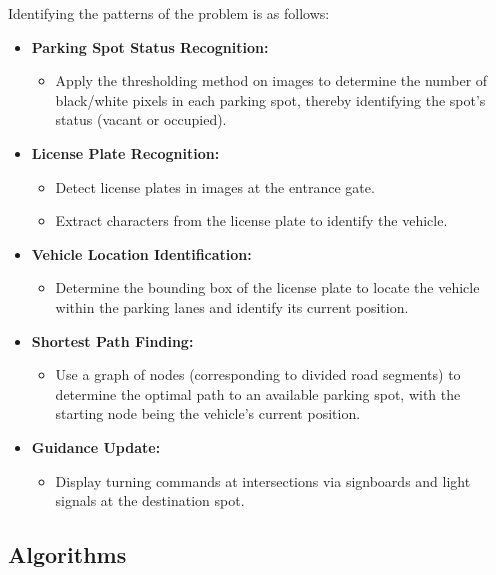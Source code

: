 \documentclass{article}
\begin{document}
\begin{itemize}[label=-]
Identifying the patterns of the problem is as follows:
\begin{itemize}[label=-]
    \item \textbf{Parking Spot Status Recognition:}
    \begin{itemize}
        \item Apply the thresholding method on images to determine the number of black/white pixels in each parking spot, thereby identifying the spot's status (vacant or occupied).
    \end{itemize}
    \item \textbf{License Plate Recognition:}
    \begin{itemize}
        \item Detect license plates in images at the entrance gate.
        \item Extract characters from the license plate to identify the vehicle.
    \end{itemize}
    \item \textbf{Vehicle Location Identification:}
    \begin{itemize}
        \item Determine the bounding box of the license plate to locate the vehicle within the parking lanes and identify its current position.
    \end{itemize}
    \item \textbf{Shortest Path Finding:}
    \begin{itemize}
        \item Use a graph of nodes (corresponding to divided road segments) to determine the optimal path to an available parking spot, with the starting node being the vehicle's current position.
    \end{itemize}
    \item \textbf{Guidance Update:}
    \begin{itemize}
        \item Display turning commands at intersections via signboards and light signals at the destination spot.
    \end{itemize}
\end{itemize}

\subsection{Algorithms}


\end{itemize}
\end{document}
